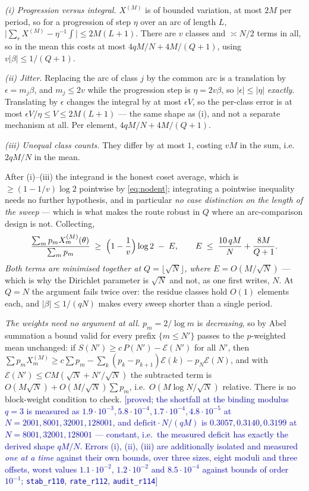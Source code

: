\documentclass[11pt,a4paper]{article}
\theoremstyle{plain}
\theoremstyle{definition}
\theoremstyle{remark}
\newcommand{\STATUS}[1]{\textcolor{blue}{\textsf{[#1]}}}
\begin{document}
\emph{(i) Progression versus integral.} $X^{(M)}$ is of bounded variation, at most $2M$ per
period, so for a progression of step $\eta$ over an arc of length $L$,
$\bigl|\sum_rX^{(M)}-\eta^{-1}\!\int\bigr|\le2M(L+1)$. There are $v$ classes and $\asymp N/2$
terms in all, so in the mean this costs at most $4qM/N+4M/(Q+1)$, using $v|\beta|\le1/(Q+1)$.

\emph{(ii) Jitter.} Replacing the arc of class $j$ by the common arc is a translation by
$\epsilon=m_j\beta$, and $m_j\le2v$ while the progression step is $\eta=2v\beta$, so
$|\epsilon|\le|\eta|$ \emph{exactly}. Translating by $\epsilon$ changes the integral by at most
$\epsilon V$, so the per-class error is at most $\epsilon V/\eta\le V\le2M(L+1)$ --- the same
shape as (i), and not a separate mechanism at all. Per element, $4qM/N+4M/(Q+1)$.

\emph{(iii) Unequal class counts.} They differ by at most $1$, costing $vM$ in the sum, i.e.\
$2qM/N$ in the mean.

After (i)--(iii) the integrand is the honest coset average, which is $\ge(1-1/v)\log2$ pointwise
by \eqref{eq:nodent}; integrating a pointwise inequality needs no further hypothesis, and in
particular \emph{no case distinction on the length of the sweep} --- which is what makes the
route robust in $Q$ where an arc-comparison design is not. Collecting,
\[
   \frac{\sum_m p_mX^{(M)}_m(\theta)}{\sum_m p_m}\;\ge\;\Bigl(1-\frac1v\Bigr)\log2
   \;-\;E,\qquad E\;\le\;\frac{10\,qM}{N}+\frac{8M}{Q+1}.
\]
\emph{Both terms are minimised together at $Q=\lfloor\sqrt N\rfloor$, where $E=O(M/\sqrt N)$} ---
which is why the Dirichlet parameter is $\sqrt N$ and not, as one first writes, $N$. At $Q=N$ the
argument fails twice over: the residue classes hold $O(1)$ elements each, and $|\beta|\le1/(qN)$
makes every sweep shorter than a single period.

\emph{The weights need no argument at all.} $p_m=2/\log m$ is \emph{decreasing}, so by Abel
summation a bound valid for every prefix $\{m\le N'\}$ passes to the $p$-weighted mean unchanged:
if $S(N')\ge c\,P(N')-\mathcal{E}(N')$ for all $N'$, then
$\sum p_mX^{(M)}_m\ge c\sum p_m-\sum_k(p_k-p_{k+1})\mathcal{E}(k)-p_{N}\mathcal{E}(N)$, and with
$\mathcal{E}(N')\le C M(\sqrt N+N'/\sqrt N)$ the subtracted term is
$O(M\sqrt N)+O(M/\sqrt N)\sum p_m$, i.e.\ $O(M\log N/\sqrt N)$ relative. There is no block-weight
condition to check.
\STATUS{proved; the shortfall at the binding modulus $q=3$ is measured as
$1.9\cdot10^{-3},5.8\cdot10^{-4},1.7\cdot10^{-4},4.8\cdot10^{-5}$ at
$N=2001,8001,32001,128001$, and $\mathrm{deficit}\cdot N/(qM)$ is
$0.3057,0.3140,0.3199$ at $N=8001,32001,128001$ --- constant, i.e.\ the measured deficit has
exactly the derived shape $qM/N$. Errors (i), (ii), (iii) are additionally isolated and measured
\emph{one at a time} against their own bounds, over three sizes, eight moduli and three offsets,
worst values $1.1\cdot10^{-2}$, $1.2\cdot10^{-2}$ and $8.5\cdot10^{-4}$ against bounds of order
$10^{-1}$; \texttt{stab\_r110}, \texttt{rate\_r112}, \texttt{audit\_r114}}
\end{document}
